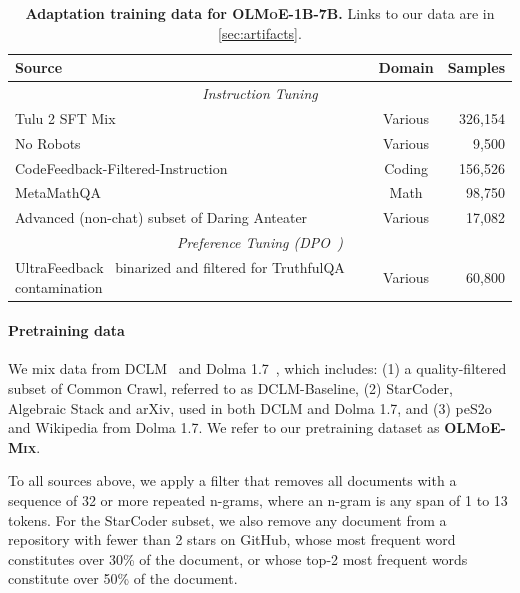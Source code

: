 \documentclass{article}
\newcommand{\data}{\textbf{\textsc{OLMoE-Mix}}}
\newcommand{\modelsmall}{\textbf{\textsc{OLMoE-1B-7B}}}
\begin{document}
\begin{table}[t]
\centering
\begin{tabular}{l|cr}
\toprule
\textbf{Source} & \textbf{Domain} & \textbf{Samples} \\
\midrule
\multicolumn{3}{c}{\textit{Instruction Tuning}} \\
\midrule
Tulu 2 SFT Mix~\citep{ivison2023camels} & Various & 326,154 \\
No Robots~\citep{no_robots} & Various & 9,500 \\
CodeFeedback-Filtered-Instruction~\citep{zheng2024opencodeinterpreter} & Coding & 156,526 \\
MetaMathQA~\citep{yu2024metamathbootstrapmathematicalquestions} & Math & 98,750 \\
Advanced (non-chat) subset of Daring Anteater~\citep{wang2024helpsteer2opensourcedatasettraining} & Various & 17,082 \\
\midrule
\multicolumn{3}{c}{\textit{Preference Tuning (DPO~\citep{rafailov2023direct})}} \\
\midrule
UltraFeedback~\citep{cui2023ultrafeedback} binarized and filtered for TruthfulQA~\citep{lin2022truthfulqa} contamination & Various & 60,800 \\
\bottomrule
\end{tabular}
\vspace{.5em}
\caption{\textbf{Adaptation training data for \modelsmall{}.} Links to our data are in \autoref{sec:artifacts}.}
\label{tab:adaptds}
\end{table}
\paragraph{Pretraining data} We mix data from DCLM~\citep{li2024datacomplm} and Dolma 1.7~\citep{soldaini2024dolma}, which includes: (1) a quality-filtered subset of Common Crawl, referred to as DCLM-Baseline, (2) StarCoder, Algebraic Stack and arXiv, used in both DCLM and Dolma 1.7, and (3) peS2o and Wikipedia from Dolma 1.7. We refer to our pretraining dataset as \data{}.

To all sources above, we apply a filter that removes all documents with a sequence of 32 or more repeated n-grams, where an n-gram is any span of 1 to 13 tokens. 
For the StarCoder subset, we also remove any document from a repository with fewer than 2 stars on GitHub, whose most frequent word constitutes over 30\% of the document, or whose top-2 most frequent words constitute over 50\% of the document.
\end{document}

